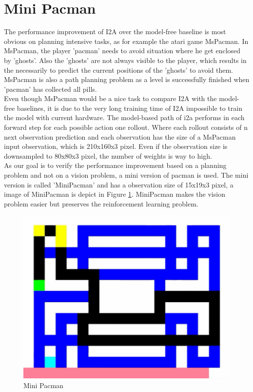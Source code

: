 \section{Mini Pacman}

The performance improvement of I2A over the model-free baseline is most obvious on planning intensive tasks, as for example the atari game MsPacman.
In MsPacman, the player 'pacman' needs to avoid situation where he get enclosed by 'ghosts'. Also the 'ghosts' are not always visible to the player, which results in the necessarily to predict the current positions of the 'ghosts' to avoid them.
MsPacman is also a path planning problem as a level is successfully finished when 'pacman' has collected all pills.\\

Even though MsPacman would be a nice task to compare I2A with the model-free baselines, it is due to the very long training time of I2A  impossible to train the model with current hardware.
The model-based path of i2a performs in each forward step for each possible action one rollout. Where each rollout consists of n next observation prediction and each observation has the size of a MsPacman input observation, which is 210x160x3 pixel. Even if the observation size is downsampled to 80x80x3 pixel, the number of weights is way to high.\\

As our goal is to verify the performance improvement based on a planning problem and not on a vision problem, a mini version of pacman is used. The mini version is called 'MiniPacman' and has a observation size of 15x19x3 pixel, a image of MiniPacman is depict in Figure \ref{fig:mini_pacman}.
MiniPacman makes the vision problem easier but preserves the reinforcement learning problem.


\begin{figure}[H] 
  \centering   
  \includegraphics[width=0.5\columnwidth]{./Images/mini_pacman.png}
  \caption{Mini Pacman} 
  \label{fig:mini_pacman} 
\end{figure} 



